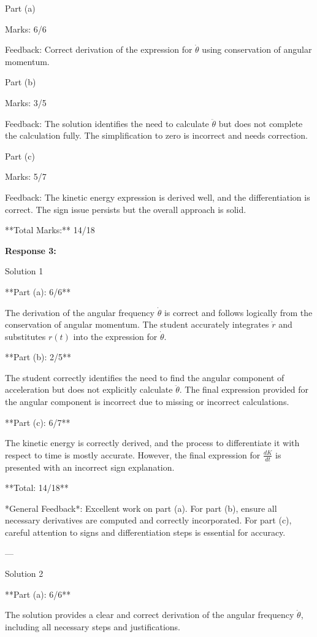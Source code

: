 \documentclass[a4paper,11pt]{article}
\begin{document}
Part (a)

Marks: 6/6

Feedback: Correct derivation of the expression for \(\dot{\theta}\) using conservation of angular momentum.

Part (b)

Marks: 3/5

Feedback: The solution identifies the need to calculate \(\ddot{\theta}\) but does not complete the calculation fully. The simplification to zero is incorrect and needs correction.

Part (c)

Marks: 5/7

Feedback: The kinetic energy expression is derived well, and the differentiation is correct. The sign issue persists but the overall approach is solid.

**Total Marks:** 14/18

\bigskip
\textbf{Response 3:}

Solution 1

**Part (a): 6/6**

The derivation of the angular frequency \(\dot{\theta}\) is correct and follows logically from the conservation of angular momentum. The student accurately integrates \(\dot{r}\) and substitutes \(r(t)\) into the expression for \(\dot{\theta}\).

**Part (b): 2/5**

The student correctly identifies the need to find the angular component of acceleration but does not explicitly calculate \(\ddot{\theta}\). The final expression provided for the angular component is incorrect due to missing or incorrect calculations.

**Part (c): 6/7**

The kinetic energy is correctly derived, and the process to differentiate it with respect to time is mostly accurate. However, the final expression for \(\frac{dK}{dt}\) is presented with an incorrect sign explanation.

**Total: 14/18**

*General Feedback*: Excellent work on part (a). For part (b), ensure all necessary derivatives are computed and correctly incorporated. For part (c), careful attention to signs and differentiation steps is essential for accuracy.

---

Solution 2

**Part (a): 6/6**

The solution provides a clear and correct derivation of the angular frequency \(\dot{\theta}\), including all necessary steps and justifications.
\end{document}
